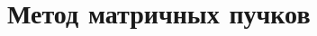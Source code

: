 \documentclass{article}
\begin{document}
	\large
	
	\section{Метод матричных пучков}
	
	
\end{document}
